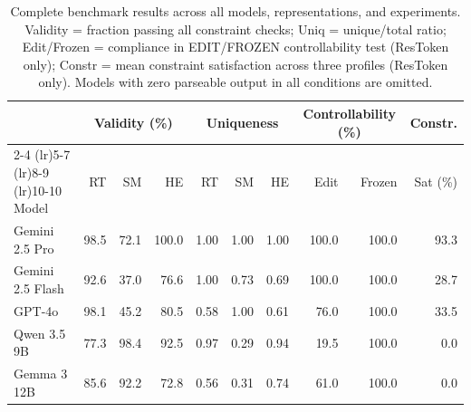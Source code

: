 \begin{table}[htbp]
\centering
\caption{Complete benchmark results across all models, representations, and experiments. Validity = fraction passing all constraint checks; Uniq = unique/total ratio; Edit/Frozen = compliance in EDIT/FROZEN controllability test (ResToken only); Constr = mean constraint satisfaction across three profiles (ResToken only). Models with zero parseable output in all conditions are omitted.}
\label{tab:w2-combined}
\footnotesize
\begin{tabular}{l *{3}{r} *{3}{r} rr r}
\toprule
& \multicolumn{3}{c}{Validity (\%)} & \multicolumn{3}{c}{Uniqueness} & \multicolumn{2}{c}{Controllability (\%)} & Constr. \\
\cmidrule(lr){2-4} \cmidrule(lr){5-7} \cmidrule(lr){8-9} \cmidrule(lr){10-10}
Model & RT & SM & HE & RT & SM & HE & Edit & Frozen & Sat (\%) \\
\midrule
Gemini 2.5 Pro & 98.5 & 72.1 & 100.0 & 1.00 & 1.00 & 1.00 & 100.0 & 100.0 & 93.3 \\
Gemini 2.5 Flash & 92.6 & 37.0 & 76.6 & 1.00 & 0.73 & 0.69 & 100.0 & 100.0 & 28.7 \\
GPT-4o & 98.1 & 45.2 & 80.5 & 0.58 & 1.00 & 0.61 & 76.0 & 100.0 & 33.5 \\
Qwen 3.5 9B & 77.3 & 98.4 & 92.5 & 0.97 & 0.29 & 0.94 & 19.5 & 100.0 & 0.0 \\
Gemma 3 12B & 85.6 & 92.2 & 72.8 & 0.56 & 0.31 & 0.74 & 61.0 & 100.0 & 0.0 \\
\bottomrule
\end{tabular}
\end{table}